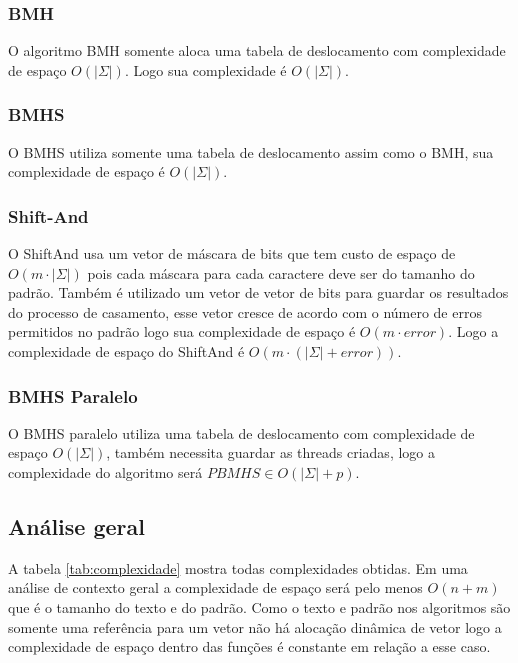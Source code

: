 \documentclass[11pt]{article}
\begin{document}
\subsubsection{BMH}
\label{sec:org230a8a9}
O algoritmo BMH somente aloca uma tabela de deslocamento com complexidade de espaço \(O(|\Sigma|)\). Logo sua complexidade é \(O(|\Sigma|)\).

\subsubsection{BMHS}
\label{sec:orgd5a2931}
O BMHS utiliza somente uma tabela de deslocamento assim como o BMH, sua complexidade de espaço é \(O(|\Sigma|)\).

\subsubsection{Shift-And}
\label{sec:org47dcd2a}
O ShiftAnd usa um vetor de máscara de bits que tem custo de espaço de \(O(m\cdot |\Sigma|)\) pois cada máscara para cada caractere deve ser do tamanho do padrão. Também é utilizado um vetor de vetor de bits para guardar os resultados do processo de casamento, esse vetor cresce de acordo com o número de erros permitidos no padrão logo sua complexidade de espaço é \(O(m\cdot error)\). Logo a complexidade de espaço do ShiftAnd é \(O(m\cdot (|\Sigma|+error))\).

\subsubsection{BMHS Paralelo}
\label{sec:orgb37d7b6}

O BMHS paralelo utiliza uma tabela de deslocamento com complexidade de espaço \(O(|\Sigma|)\), também necessita guardar as threads criadas, logo a complexidade do algoritmo será \(PBMHS \in O(|\Sigma|+p)\).

\subsection{Análise geral}
\label{sec:org9483a9e}
A tabela \ref{tab:complexidade} mostra todas complexidades obtidas. Em uma análise de contexto geral a complexidade de espaço será pelo menos \(O(n+m)\) que é o tamanho do texto e do padrão. Como o texto e padrão nos algoritmos são somente uma referência para um vetor não há alocação dinâmica de vetor logo a complexidade de espaço dentro das funções é constante em relação a esse caso.
\end{document}
